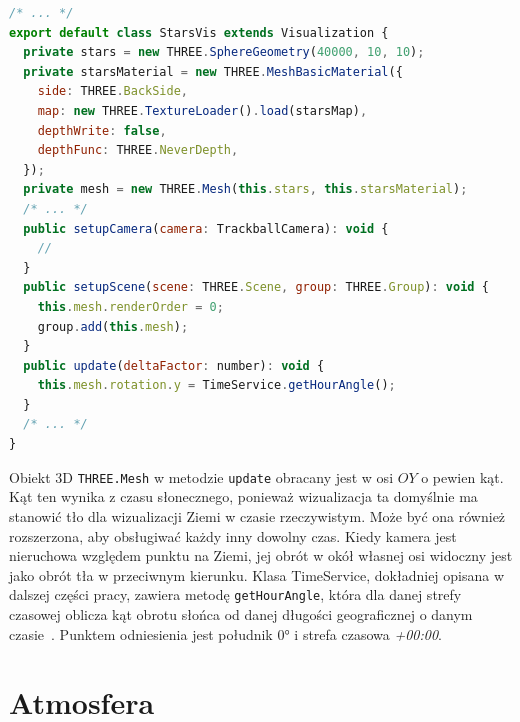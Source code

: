 \begin{lstlisting}[float, language=javascript, label={lst:starsVis}, caption={
    Fragmenty klasy \texttt{StarsVis}}
]
/* ... */
export default class StarsVis extends Visualization {
  private stars = new THREE.SphereGeometry(40000, 10, 10);
  private starsMaterial = new THREE.MeshBasicMaterial({
    side: THREE.BackSide,
    map: new THREE.TextureLoader().load(starsMap),
    depthWrite: false,
    depthFunc: THREE.NeverDepth,
  });
  private mesh = new THREE.Mesh(this.stars, this.starsMaterial);
  /* ... */
  public setupCamera(camera: TrackballCamera): void {
    //
  }
  public setupScene(scene: THREE.Scene, group: THREE.Group): void {
    this.mesh.renderOrder = 0;
    group.add(this.mesh);
  }
  public update(deltaFactor: number): void {
    this.mesh.rotation.y = TimeService.getHourAngle();
  }
  /* ... */
}
\end{lstlisting}

Obiekt 3D \texttt{THREE.Mesh} w metodzie \texttt{update} obracany jest w osi $OY$ o pewien kąt. Kąt ten wynika z czasu słonecznego, ponieważ wizualizacja ta domyślnie ma stanowić tło dla wizualizacji Ziemi w czasie rzeczywistym. Może być ona również rozszerzona, aby obsługiwać każdy inny dowolny czas. Kiedy kamera jest nieruchowa względem punktu na Ziemi, jej obrót w okół własnej osi widoczny jest jako obrót tła w przeciwnym kierunku. Klasa TimeService, dokładniej opisana w dalszej części pracy, zawiera metodę \texttt{getHourAngle}, która dla danej strefy czasowej oblicza kąt obrotu słońca od danej długości geograficznej o danym czasie~\cite{SolarTime}. Punktem odniesienia jest południk $\ang{0}$ i strefa czasowa \textit{+00:00}. 

\section{Atmosfera}